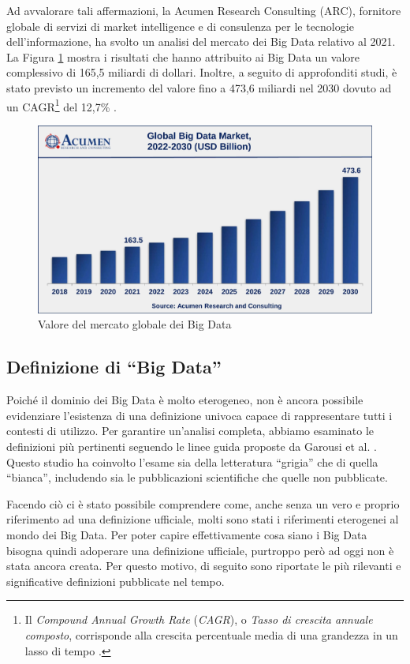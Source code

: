 Ad avvalorare tali affermazioni, la Acumen Research Consulting (ARC), fornitore globale di servizi di market intelligence e di consulenza per le tecnologie dell'informazione, ha svolto un analisi del mercato dei Big Data relativo al 2021. La Figura \ref{fig:Global-Big-Data-Market} mostra i risultati che hanno attribuito ai Big Data un valore complessivo di 165,5 miliardi di dollari. Inoltre, a seguito di approfonditi studi, è stato previsto un incremento del valore fino a 473,6 miliardi nel 2030 dovuto ad un CAGR\footnote{Il \textit{Compound Annual Growth Rate} (\textit{CAGR}), o \textit{Tasso di crescita annuale composto}, corrisponde alla crescita percentuale media di una grandezza in un lasso di tempo \cite{borsa_italiana_cagr}.} del 12,7\% \cite{acumen_big_data_market}.

\begin{figure}[H]
    \centering
    \includegraphics[width=0.7\linewidth]{figure/capitolo_2/Global-Big-Data-Market.pdf}
    \caption{Valore del mercato globale dei Big Data}
    \label{fig:Global-Big-Data-Market}
\end{figure}

\subsection{Definizione di ``Big Data''}

Poiché il dominio dei Big Data è molto eterogeneo, non è ancora possibile evidenziare l'esistenza di una definizione univoca capace di rappresentare tutti i contesti di utilizzo. Per garantire un'analisi completa, abbiamo esaminato le definizioni più pertinenti seguendo le linee guida proposte da Garousi et al. \cite{GAROUSI}. Questo studio ha coinvolto l'esame sia della letteratura ``grigia'' che di quella ``bianca'', includendo sia le pubblicazioni scientifiche che quelle non pubblicate.

Facendo ciò ci è stato possibile comprendere come, anche senza un vero e proprio riferimento ad una definizione ufficiale, molti sono stati i riferimenti eterogenei al mondo dei Big Data. Per poter capire effettivamente cosa siano i Big Data bisogna quindi adoperare una definizione ufficiale, purtroppo però ad oggi non è stata ancora creata. Per questo motivo, di seguito sono riportate le più rilevanti e significative definizioni pubblicate nel tempo.

